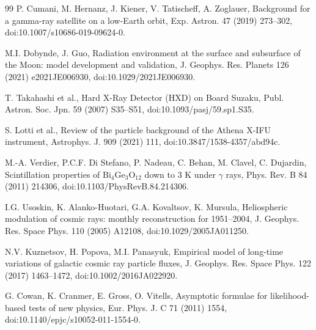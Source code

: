 \documentclass[11pt]{article}
\newcommand{\revblue}[1]{\textcolor{revisionblue}{#1}}
\begin{document}
\begin{thebibliography}{99}
P. Cumani, M. Hernanz, J. Kiener, V. Tatischeff, A. Zoglauer,
Background for a gamma-ray satellite on a low-Earth orbit,
Exp. Astron. 47 (2019) 273--302,
doi:10.1007/s10686-019-09624-0.

M.I. Dobynde, J. Guo,
Radiation environment at the surface and subsurface of the Moon:
model development and validation,
J. Geophys. Res. Planets 126 (2021) e2021JE006930,
doi:10.1029/2021JE006930.

\revblue{T. Takahashi et al., Hard X-Ray Detector (HXD) on Board Suzaku,
Publ. Astron. Soc. Jpn. 59 (2007) S35--S51,
doi:10.1093/pasj/59.sp1.S35.}

S. Lotti et al.,
Review of the particle background of the Athena X-IFU instrument,
Astrophys. J. 909 (2021) 111,
doi:10.3847/1538-4357/abd94c.

\revblue{M.-A. Verdier, P.C.F. Di Stefano, P. Nadeau, C. Behan, M. Clavel, C. Dujardin,
Scintillation properties of $\mathrm{Bi_4Ge_3O_{12}}$ down to 3 K under
$\gamma$ rays,
Phys. Rev. B 84 (2011) 214306,
doi:10.1103/PhysRevB.84.214306.}

I.G. Usoskin, K. Alanko-Huotari, G.A. Kovaltsov, K. Mursula,
Heliospheric modulation of cosmic rays: monthly reconstruction for 1951--2004,
J. Geophys. Res. Space Phys. 110 (2005) A12108,
doi:10.1029/2005JA011250.

N.V. Kuznetsov, H. Popova, M.I. Panasyuk,
Empirical model of long-time variations of galactic cosmic ray particle fluxes,
J. Geophys. Res. Space Phys. 122 (2017) 1463--1472,
doi:10.1002/2016JA022920.

G. Cowan, K. Cranmer, E. Gross, O. Vitells, Asymptotic formulae for likelihood-based tests of new physics, Eur. Phys. J. C 71 (2011) 1554, doi:10.1140/epjc/s10052-011-1554-0.

\end{thebibliography}
\end{document}
